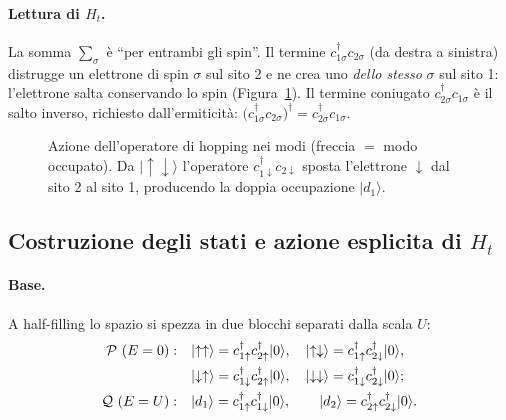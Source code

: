 \documentclass[11pt,a4paper]{article}
\newcommand{\ket}[1]{\lvert #1 \rangle}
\newcommand{\up}{\uparrow}
\newcommand{\dn}{\downarrow}
\newcommand{\dg}{\dagger}
\theoremstyle{definition}
\theoremstyle{remark}
\newcommand{\arrowup}[2]{\draw[spinup,line width=1.2pt,-{Stealth[length=2.4mm,width=2mm]}] (#1,{#2-0.22}) -- (#1,{#2+0.24});}
\newcommand{\arrowdn}[2]{\draw[spindown,line width=1.2pt,-{Stealth[length=2.4mm,width=2mm]}] (#1,{#2+0.22}) -- (#1,{#2-0.24});}
\begin{document}
\paragraph{Lettura di $H_t$.} La somma $\sum_\sigma$ è ``per entrambi gli spin''. Il termine
$c_{1\sigma}^{\dg}c_{2\sigma}$ (da destra a sinistra) distrugge un elettrone di spin $\sigma$ sul sito 2 e
ne crea uno \emph{dello stesso} $\sigma$ sul sito 1: l'elettrone salta conservando lo spin
(Figura~\ref{fig:hop}). Il termine coniugato $c_{2\sigma}^{\dg}c_{1\sigma}$ è il salto inverso, richiesto
dall'ermiticità: $\big(c_{1\sigma}^{\dg}c_{2\sigma}\big)^{\dg}=c_{2\sigma}^{\dg}c_{1\sigma}$.

\begin{figure}[htbp]
\centering
{}
\caption{Azione dell'operatore di hopping nei modi (freccia $=$ modo occupato). Da $\ket{\up\dn}$
l'operatore $c_{1\dn}^{\dg}c_{2\dn}$ sposta l'elettrone $\dn$ dal sito 2 al sito 1, producendo la doppia
occupazione $\ket{d_1}$.}
\label{fig:hop}
\end{figure}

\subsection{Costruzione degli stati e azione esplicita di $H_t$}
\label{sub:fermioni}

\paragraph{Base.} A half-filling lo spazio si spezza in due blocchi separati dalla scala $U$:
\begin{align}
\mathcal P\ (E=0):\quad
&\ket{\up\up}=c_{1\up}^{\dg}c_{2\up}^{\dg}\ket{0},\quad
\ket{\up\dn}=c_{1\up}^{\dg}c_{2\dn}^{\dg}\ket{0},\notag\\
&\ket{\dn\up}=c_{1\dn}^{\dg}c_{2\up}^{\dg}\ket{0},\quad
\ket{\dn\dn}=c_{1\dn}^{\dg}c_{2\dn}^{\dg}\ket{0};\\
\mathcal Q\ (E=U):\quad
&\ket{d_1}=c_{1\up}^{\dg}c_{1\dn}^{\dg}\ket{0},\qquad
\ket{d_2}=c_{2\up}^{\dg}c_{2\dn}^{\dg}\ket{0}.
\end{align}
\end{document}
